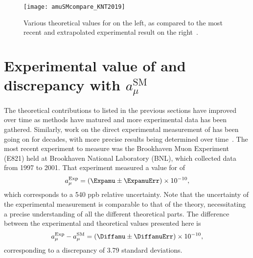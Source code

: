 
\begin{figure}
	\centering
	\texttt{[image: amuSMcompare\_KNT2019]}
	\caption[Comparison between theoretical and experimental values for \amu]{Various theoretical values for \amu on the left, as compared to the most recent and extrapolated experimental result on the right~\cite{Keshavarzi:2019abf}.}
	\label{fig:AlexKPaperComparison}
\end{figure}


\section{Experimental value of \amu and discrepancy with \texorpdfstring{$a_{\mu}^{\text{SM}}$}{amusm}}
\label{sec:Background}


The theoretical contributions to \amu listed in the previous sections have improved over time as methods have matured and more experimental data has been gathered. Similarly, work on the direct experimental measurement of \amu has been going on for decades, with more precise results being determined over time~\cite{PastExperiments}. The most recent experiment to measure \gmtwo was the Brookhaven Muon \gmtwo Experiment (E821) held at Brookhaven National Laboratory (BNL), which collected data from 1997 to 2001. That experiment measured a value for \amu of~\cite{E821FinalReport,CODATA}
		\begin{align}
            a_{\mu}^{\text{Exp}} = (\Expamu \pm \ExpamuErr) \times 10^{-10},
		\end{align}
which corresponds to a 540 ppb relative uncertainty. Note that the uncertainty of the experimental measurement is comparable to that of the theory, necessitating a precise understanding of all the different theoretical parts. The difference between the experimental and theoretical values presented here is
		\begin{align}
            a_{\mu}^{\text{Exp}} - a_{\mu}^{\text{SM}} = (\Diffamu \pm \DiffamuErr) \times 10^{-10},
		\end{align}
corresponding to a discrepancy of 3.79 standard deviations.



